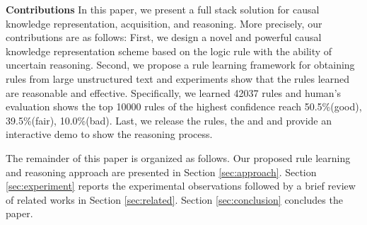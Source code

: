 \textbf{Contributions}
In this paper, we present a full stack solution for causal knowledge representation, acquisition, and reasoning. More precisely, our contributions are as follows:
First, we design a novel and powerful causal knowledge representation scheme based on the logic rule with the ability of uncertain reasoning.
Second, we propose a rule learning framework for obtaining rules from large unstructured text and experiments show that the rules learned are reasonable and effective. 
Specifically, we learned 42037 rules and human's evaluation shows the top 10000 rules of the highest confidence reach 50.5\%(good), 39.5\%(fair), 10.0\%(bad). Last, we release the rules, the \zhpro and \zhcon and provide an interactive demo to show the reasoning process.
	
The remainder of this paper is organized as follows. Our proposed rule learning and reasoning approach are presented in Section \ref{sec:approach}. Section \ref{sec:experiment} reports the experimental observations followed by a brief review of related works in Section \ref{sec:related}. Section \ref{sec:conclusion} concludes the paper.

%	
	
	
